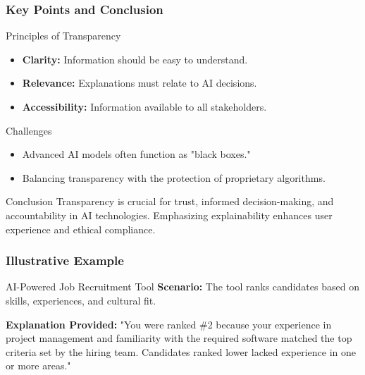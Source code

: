\documentclass[aspectratio=169]{beamer}
\begin{document}
\begin{frame}[fragile]
    \frametitle{Key Points and Conclusion}
    \begin{block}{Principles of Transparency}
        \begin{itemize}
            \item \textbf{Clarity:} Information should be easy to understand.
            \item \textbf{Relevance:} Explanations must relate to AI decisions.
            \item \textbf{Accessibility:} Information available to all stakeholders.
        \end{itemize}
    \end{block}
    
    \begin{block}{Challenges}
        \begin{itemize}
            \item Advanced AI models often function as "black boxes."
            \item Balancing transparency with the protection of proprietary algorithms.
        \end{itemize}
    \end{block}

    \begin{block}{Conclusion}
        Transparency is crucial for trust, informed decision-making, and accountability in AI technologies. Emphasizing explainability enhances user experience and ethical compliance.
    \end{block}
\end{frame}

\begin{frame}[fragile]
    \frametitle{Illustrative Example}
    \begin{block}{AI-Powered Job Recruitment Tool}
        \textbf{Scenario:} The tool ranks candidates based on skills, experiences, and cultural fit.
        
        \textbf{Explanation Provided:} "You were ranked \#2 because your experience in project management and familiarity with the required software matched the top criteria set by the hiring team. Candidates ranked lower lacked experience in one or more areas."
    \end{block}
\end{frame}
\end{document}
